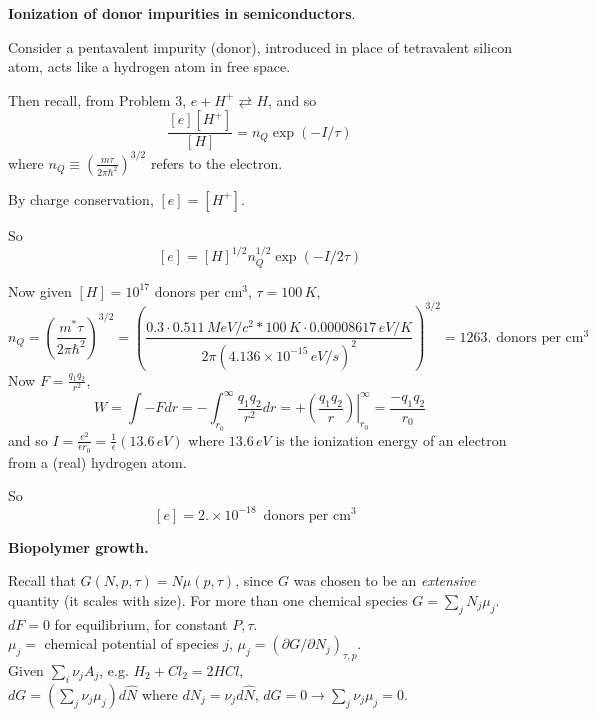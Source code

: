 \documentclass[twoside]{amsart}
\theoremstyle{plain}
\theoremstyle{definition}
\newcommand{\solutionhead}[1]
  {
   \noindent{\small\bf Solution #1.}
   }
\begin{document}
\solutionhead{3} \textbf{Ionization of donor impurities in semiconductors}.

Consider a pentavalent impurity (donor), introduced in place of tetravalent silicon atom, acts like a hydrogen atom in free space.  

Then recall, from Problem 3, $e + H^+ \rightleftarrows H$, and so 
\[
\frac{ [e][H^+]}{ [H] } =  n_Q  \exp{ (-I/\tau)}
\]
where $n_Q \equiv \left( \frac{ m\tau }{2\pi \hbar^2 } \right)^{3/2}$ refers to the electron.  

By charge conservation, $[e] = [H^+]$.  

So
\[
[e] = [H]^{1/2} n_Q^{1/2} \exp{ (-I/2\tau)}
\]

Now given $[H] = 10^{17}$ donors per $\text{cm}^3$,  $\tau = 100 \, K$, 
\[
n_Q = \left( \frac{m^* \tau}{2\pi \hbar^2 }\right)^{3/2} = \left( \frac{ 0.3 \cdot 0.511 \, MeV/c^2* 100 \, K \cdot 0.00008617 \, eV/K }{ 2 \pi (4.136 \times 10^{-15} \, eV/s)^2 } \right)^{3/2} = 1263. \text{ donors per $\text{cm}^3$ }
\]
Now $F = \frac{q_1q_2}{r^2}$, 
\[
W = \int -F dr = - \int_{r_0}^{\infty} \frac{q_1 q_2}{r^2} dr = + \left. \left( \frac{q_1 q_2 }{r} \right) \right|_{r_0}^{\infty} = \frac{-q_1 q_2}{r_0}
\]
and so $I = \frac{e^2}{\epsilon r_0} = \frac{1}{\epsilon}(13.6 \, eV)$ where $13.6 \, eV$ is the ionization energy of an electron from a (real) hydrogen atom. 

So
\[
[e]= 2. \times 10^{-18} \, \text{ donors per $\text{cm}^3$ }
\]
















\solutionhead{4} \textbf{Biopolymer growth.}  

Recall that $G(N,p,\tau) = N\mu(p,\tau)$, since $G$ was chosen to be an \emph{extensive} quantity (it scales with size).  For more than one chemical species $G = \sum_j N_j \mu_j$.  \\
$dF = 0$ for equilibrium, for constant $P,\tau$.   \quad \\ 

$\mu_j = $ chemical potential of species $j$, $\mu_j = (\partial G/\partial N_j)_{ \tau, p}$.   \quad \\ 

Given $\sum_i \nu_j A_j$, e.g. $H_2 + Cl_2 = 2HCl$, \\
$dG = (\sum_j \nu_j \mu_j )d\hat{N}$ where $dN_j = \nu_j d\hat{N}$, $dG = 0 \to \sum_j \nu_j \mu_j =0$.   \quad \\ 
\end{document}
